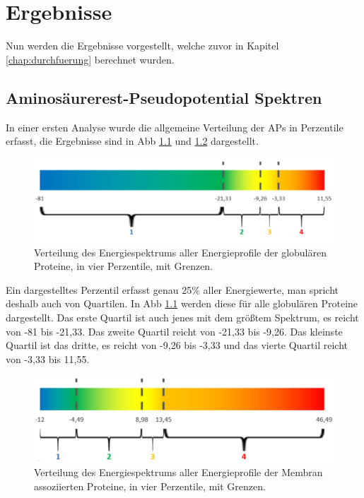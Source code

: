 \chapter{Ergebnisse}
\label{chap:ergebnisse}

Nun werden die Ergebnisse vorgestellt, welche zuvor in Kapitel \ref{chap:durchfuerung} berechnet wurden.



\section{Aminosäurerest-Pseudopotential Spektren}

In einer ersten Analyse wurde die allgemeine Verteilung der \ac{APs} in Perzentile erfasst, die Ergebnisse sind in \ac{Abb} \ref{fig:quartiles_glob} und \ref{fig:quartiles_memb} dargestellt. 

\begin{figure}[H]
    \centering
    \includegraphics[width=.95\textwidth]{images/Quartil_glob.png}
    \caption{Verteilung des Energiespektrums aller Energieprofile der globulären Proteine, in vier Perzentile, mit Grenzen.}
    \label{fig:quartiles_glob}
\end{figure}

Ein dargestelltes Perzentil erfasst genau 25\% aller Energiewerte, man spricht deshalb auch von Quartilen. In \ac{Abb} \ref{fig:quartiles_glob} werden diese für alle globulären Proteine dargestellt. Das erste Quartil ist auch jenes mit dem größtem Spektrum, es reicht von -81 bis -21,33. Das zweite Quartil reicht von -21,33 bis -9,26. Das kleinste Quartil ist das dritte, es reicht von -9,26 bis -3,33 und das vierte Quartil reicht von -3,33 bis 11,55. 

\begin{figure}
    \centering
    \includegraphics[width=.95\textwidth]{images/Quartil_memb.png}
    \caption{Verteilung des Energiespektrums aller Energieprofile der Membran assoziierten Proteine, in vier Perzentile, mit Grenzen.}
    \label{fig:quartiles_memb}
\end{figure}

